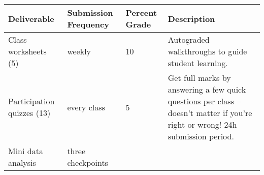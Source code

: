 \documentclass[
]{article}
\begin{document}
\begin{longtable}[]{@{}llll@{}}
\toprule
\begin{minipage}[b]{0.25\columnwidth}\raggedright
Deliverable\strut
\end{minipage} & \begin{minipage}[b]{0.28\columnwidth}\raggedright
Submission Frequency\strut
\end{minipage} & \begin{minipage}[b]{0.19\columnwidth}\raggedright
Percent Grade\strut
\end{minipage} & \begin{minipage}[b]{0.16\columnwidth}\raggedright
Description\strut
\end{minipage}\tabularnewline
\midrule
\endhead
\begin{minipage}[t]{0.25\columnwidth}\raggedright
Class worksheets (5)\strut
\end{minipage} & \begin{minipage}[t]{0.28\columnwidth}\raggedright
weekly\strut
\end{minipage} & \begin{minipage}[t]{0.19\columnwidth}\raggedright
10\strut
\end{minipage} & \begin{minipage}[t]{0.16\columnwidth}\raggedright
Autograded walkthroughs to guide student learning.\strut
\end{minipage}\tabularnewline
\begin{minipage}[t]{0.25\columnwidth}\raggedright
Participation quizzes (13)\strut
\end{minipage} & \begin{minipage}[t]{0.28\columnwidth}\raggedright
every class\strut
\end{minipage} & \begin{minipage}[t]{0.19\columnwidth}\raggedright
5\strut
\end{minipage} & \begin{minipage}[t]{0.16\columnwidth}\raggedright
Get full marks by answering a few quick questions per class -- doesn't
matter if you're right or wrong! 24h submission period.\strut
\end{minipage}\tabularnewline
\begin{minipage}[t]{0.25\columnwidth}\raggedright
Mini data analysis\strut
\end{minipage} & \begin{minipage}[t]{0.28\columnwidth}\raggedright
three checkpoints\strut
\end{minipage} & \begin{minipage}[t]{0.19\columnwidth}\raggedright

\end{minipage}
\end{longtable}
\end{document}
